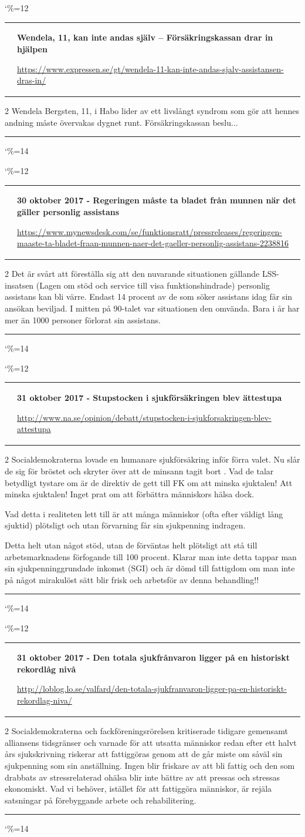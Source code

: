 \documentclass[a4paper]{article}
\makeatletter
\newcommand{\entry}{
\catcode`\%=12
\@entry}
\newcommand{\@entry}[3]{
\bigskip
\begin{tabular*}{\textwidth}{l m{\textwidth-4cm}}
\qrcode{#3} & \textbf{#1}

\medskip

\url{#3}

\end{tabular*}

\medskip


\begin{multicols}{2}
#2
\end{multicols}

\medskip
\hrule

\catcode`\%=14
}
\makeatother
\begin{document}
{{\entry{Wendela, 11, kan inte andas själv – Försäkringskassan drar in hjälpen}{Wendela Bergsten, 11, i Habo lider av ett livslångt syndrom som gör att hennes andning måste övervakas dygnet runt. Försäkringskassan beslu...}
{https://www.expressen.se/gt/wendela-11-kan-inte-andas-sjalv-assistansen-dras-in/}


\entry{30 oktober 2017 - Regeringen måste ta bladet från munnen när det gäller personlig assistans}{Det är svårt att föreställa sig att den nuvarande situationen gällande LSS-insatsen (Lagen om stöd och service till visa funktionshindrade) personlig assistans kan bli värre. Endast 14 procent av de som söker assistans idag får sin ansökan beviljad. I mitten på 90-talet var situationen den omvända. Bara i år har mer än 1000 personer förlorat sin assistans.}{https://www.mynewsdesk.com/se/funktionsratt/pressreleases/regeringen-maaste-ta-bladet-fraan-munnen-naer-det-gaeller-personlig-assistans-2238816}

\entry{31 oktober 2017 - Stupstocken i sjukförsäkringen blev ättestupa}{Socialdemokraterna lovade en humanare sjukförsäkring inför förra valet. Nu slår de sig för bröstet och skryter över att de minsann tagit bort \say{stupstocken}. Vad de talar betydligt tystare om är de direktiv de gett till FK om att minska sjuktalen! Att minska sjuktalen! Inget prat om att förbättra människors hälsa dock.

Vad detta i realiteten lett till är att många människor (ofta efter väldigt lång sjuktid) plötsligt och utan förvarning får sin sjukpenning indragen.

Detta helt utan något stöd, utan de förväntas helt plötsligt att stå till arbetsmarknadens förfogande till 100 procent. Klarar man inte detta tappar man sin sjukpenninggrundade inkomst (SGI) och är dömd till fattigdom om man inte på något mirakulöst sätt blir frisk och arbetsför av denna behandling!!
}{http://www.na.se/opinion/debatt/stupstocken-i-sjukforsakringen-blev-attestupa}

\entry{31 oktober 2017 - Den totala sjukfrånvaron ligger på en historiskt rekordlåg nivå}{Socialdemokraterna och fackföreningsrörelsen kritiserade tidigare gemensamt alliansens tidsgränser och varnade för att utsatta människor redan efter ett halvt års sjukskrivning riskerar att fattiggöras genom att de går miste om såväl sin sjukpenning som sin anställning. Ingen blir friskare av att bli fattig och den som drabbats av stressrelaterad ohälsa blir inte bättre av att pressas och stressas ekonomiskt. Vad vi behöver, istället för att fattiggöra människor, är rejäla satsningar på förebyggande arbete och rehabilitering.}{http://loblog.lo.se/valfard/den-totala-sjukfranvaron-ligger-pa-en-historiskt-rekordlag-niva/}

}}
\end{document}
